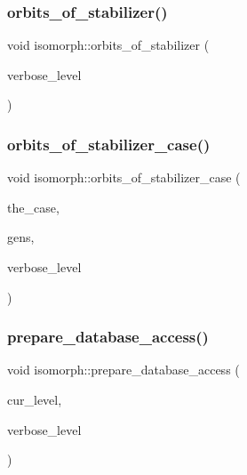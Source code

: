\mbox{\label{classisomorph_a72bbdc12cca5a90045ef15d0b24075e6}} 
\subsubsection{\texorpdfstring{orbits\+\_\+of\+\_\+stabilizer()}{orbits\_of\_stabilizer()}}
{\footnotesize\ttfamily void isomorph\+::orbits\+\_\+of\+\_\+stabilizer (\begin{DoxyParamCaption}\item[{\mbox{\hyperlink{galois_8h_a09fddde158a3a20bd2dcadb609de11dc}{I\+NT}}}]{verbose\+\_\+level }\end{DoxyParamCaption})}

\mbox{\label{classisomorph_a3b94e31db6bd2516bccb74b772678835}} 
\subsubsection{\texorpdfstring{orbits\+\_\+of\+\_\+stabilizer\+\_\+case()}{orbits\_of\_stabilizer\_case()}}
{\footnotesize\ttfamily void isomorph\+::orbits\+\_\+of\+\_\+stabilizer\+\_\+case (\begin{DoxyParamCaption}\item[{\mbox{\hyperlink{galois_8h_a09fddde158a3a20bd2dcadb609de11dc}{I\+NT}}}]{the\+\_\+case,  }\item[{\mbox{\hyperlink{classvector__ge}{vector\+\_\+ge}} \&}]{gens,  }\item[{\mbox{\hyperlink{galois_8h_a09fddde158a3a20bd2dcadb609de11dc}{I\+NT}}}]{verbose\+\_\+level }\end{DoxyParamCaption})}

\mbox{\label{classisomorph_a627df029f7f2e59f588c2a44bbe7c201}} 
\subsubsection{\texorpdfstring{prepare\+\_\+database\+\_\+access()}{prepare\_database\_access()}}
{\footnotesize\ttfamily void isomorph\+::prepare\+\_\+database\+\_\+access (\begin{DoxyParamCaption}\item[{\mbox{\hyperlink{galois_8h_a09fddde158a3a20bd2dcadb609de11dc}{I\+NT}}}]{cur\+\_\+level,  }\item[{\mbox{\hyperlink{galois_8h_a09fddde158a3a20bd2dcadb609de11dc}{I\+NT}}}]{verbose\+\_\+level }\end{DoxyParamCaption})}

